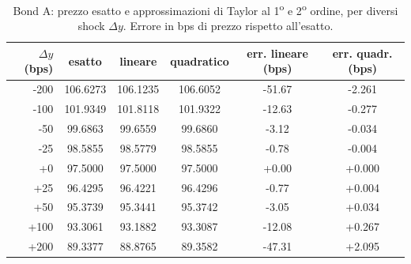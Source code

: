 \begin{table}[H]\centering\small
\caption{Bond A: prezzo esatto e approssimazioni di Taylor al 1\textsuperscript{o} e 2\textsuperscript{o} ordine, per diversi shock $\Delta y$. Errore in bps di prezzo rispetto all'esatto.}
\label{tab:taylor-confronto}\renewcommand{\arraystretch}{1.15}
\begin{tabular}{rccccc}
\toprule
$\Delta y$ (bps) & esatto & lineare & quadratico & err. lineare (bps) & err. quadr. (bps)\\
\midrule
\rowcolor{rowtint}-200 & 106.6273 & 106.1235 & 106.6052 & -51.67 & -2.261\\
-100 & 101.9349 & 101.8118 & 101.9322 & -12.63 & -0.277\\
\rowcolor{rowtint}-50 & 99.6863 & 99.6559 & 99.6860 & -3.12 & -0.034\\
-25 & 98.5855 & 98.5779 & 98.5855 & -0.78 & -0.004\\
\rowcolor{rowtint}+0 & 97.5000 & 97.5000 & 97.5000 & +0.00 & +0.000\\
+25 & 96.4295 & 96.4221 & 96.4296 & -0.77 & +0.004\\
\rowcolor{rowtint}+50 & 95.3739 & 95.3441 & 95.3742 & -3.05 & +0.034\\
+100 & 93.3061 & 93.1882 & 93.3087 & -12.08 & +0.267\\
\rowcolor{rowtint}+200 & 89.3377 & 88.8765 & 89.3582 & -47.31 & +2.095\\
\bottomrule
\end{tabular}
\end{table}
